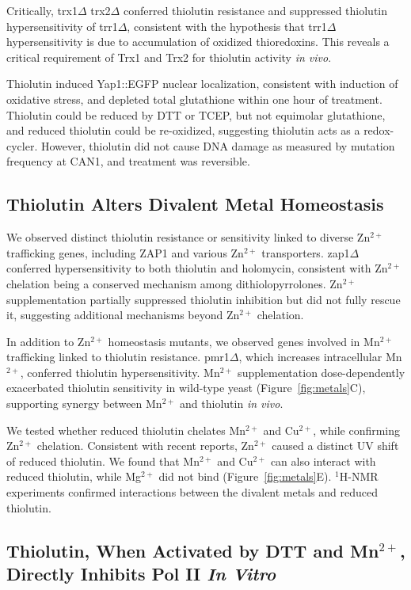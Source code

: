 \documentclass[11pt]{article}
\begin{document}
Critically, trx1$\Delta$ trx2$\Delta$ conferred thiolutin resistance and suppressed thiolutin hypersensitivity of trr1$\Delta$, consistent with the hypothesis that trr1$\Delta$ hypersensitivity is due to accumulation of oxidized thioredoxins. This reveals a critical requirement of Trx1 and Trx2 for thiolutin activity \textit{in vivo}.

Thiolutin induced Yap1::EGFP nuclear localization, consistent with induction of oxidative stress, and depleted total glutathione within one hour of treatment. Thiolutin could be reduced by DTT or TCEP, but not equimolar glutathione, and reduced thiolutin could be re-oxidized, suggesting thiolutin acts as a redox-cycler. However, thiolutin did not cause DNA damage as measured by mutation frequency at CAN1, and treatment was reversible.

\subsection{Thiolutin Alters Divalent Metal Homeostasis}

We observed distinct thiolutin resistance or sensitivity linked to diverse Zn$^{2+}$ trafficking genes, including ZAP1 and various Zn$^{2+}$ transporters. zap1$\Delta$ conferred hypersensitivity to both thiolutin and holomycin, consistent with Zn$^{2+}$ chelation being a conserved mechanism among dithiolopyrrolones. Zn$^{2+}$ supplementation partially suppressed thiolutin inhibition but did not fully rescue it, suggesting additional mechanisms beyond Zn$^{2+}$ chelation.

In addition to Zn$^{2+}$ homeostasis mutants, we observed genes involved in Mn$^{2+}$ trafficking linked to thiolutin resistance. pmr1$\Delta$, which increases intracellular Mn$^{2+}$, conferred thiolutin hypersensitivity. Mn$^{2+}$ supplementation dose-dependently exacerbated thiolutin sensitivity in wild-type yeast (Figure~\ref{fig:metals}C), supporting synergy between Mn$^{2+}$ and thiolutin \textit{in vivo}.

We tested whether reduced thiolutin chelates Mn$^{2+}$ and Cu$^{2+}$, while confirming Zn$^{2+}$ chelation. Consistent with recent reports, Zn$^{2+}$ caused a distinct UV shift of reduced thiolutin. We found that Mn$^{2+}$ and Cu$^{2+}$ can also interact with reduced thiolutin, while Mg$^{2+}$ did not bind (Figure~\ref{fig:metals}E). $^1$H-NMR experiments confirmed interactions between the divalent metals and reduced thiolutin.

\subsection{Thiolutin, When Activated by DTT and Mn$^{2+}$, Directly Inhibits Pol II \textit{In Vitro}}
\end{document}
